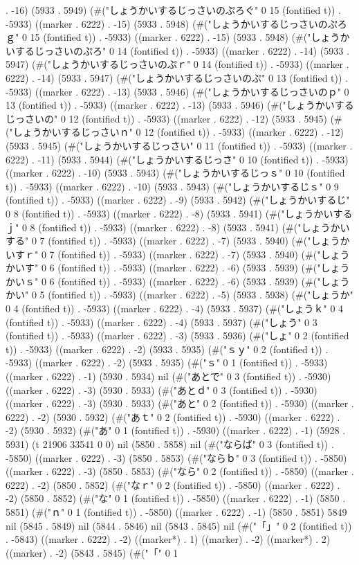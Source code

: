 . -16) (5933 . 5949) (#("しょうかいするじっさいのぷろぐ" 0 15 (fontified t)) . -5933) ((marker . 6222) . -15) (5933 . 5948) (#("しょうかいするじっさいのぷろｇ" 0 15 (fontified t)) . -5933) ((marker . 6222) . -15) (5933 . 5948) (#("しょうかいするじっさいのぷろ" 0 14 (fontified t)) . -5933) ((marker . 6222) . -14) (5933 . 5947) (#("しょうかいするじっさいのぷｒ" 0 14 (fontified t)) . -5933) ((marker . 6222) . -14) (5933 . 5947) (#("しょうかいするじっさいのぷ" 0 13 (fontified t)) . -5933) ((marker . 6222) . -13) (5933 . 5946) (#("しょうかいするじっさいのｐ" 0 13 (fontified t)) . -5933) ((marker . 6222) . -13) (5933 . 5946) (#("しょうかいするじっさいの" 0 12 (fontified t)) . -5933) ((marker . 6222) . -12) (5933 . 5945) (#("しょうかいするじっさいｎ" 0 12 (fontified t)) . -5933) ((marker . 6222) . -12) (5933 . 5945) (#("しょうかいするじっさい" 0 11 (fontified t)) . -5933) ((marker . 6222) . -11) (5933 . 5944) (#("しょうかいするじっさ" 0 10 (fontified t)) . -5933) ((marker . 6222) . -10) (5933 . 5943) (#("しょうかいするじっｓ" 0 10 (fontified t)) . -5933) ((marker . 6222) . -10) (5933 . 5943) (#("しょうかいするじｓ" 0 9 (fontified t)) . -5933) ((marker . 6222) . -9) (5933 . 5942) (#("しょうかいするじ" 0 8 (fontified t)) . -5933) ((marker . 6222) . -8) (5933 . 5941) (#("しょうかいするｊ" 0 8 (fontified t)) . -5933) ((marker . 6222) . -8) (5933 . 5941) (#("しょうかいする" 0 7 (fontified t)) . -5933) ((marker . 6222) . -7) (5933 . 5940) (#("しょうかいすｒ" 0 7 (fontified t)) . -5933) ((marker . 6222) . -7) (5933 . 5940) (#("しょうかいす" 0 6 (fontified t)) . -5933) ((marker . 6222) . -6) (5933 . 5939) (#("しょうかいｓ" 0 6 (fontified t)) . -5933) ((marker . 6222) . -6) (5933 . 5939) (#("しょうかい" 0 5 (fontified t)) . -5933) ((marker . 6222) . -5) (5933 . 5938) (#("しょうか" 0 4 (fontified t)) . -5933) ((marker . 6222) . -4) (5933 . 5937) (#("しょうｋ" 0 4 (fontified t)) . -5933) ((marker . 6222) . -4) (5933 . 5937) (#("しょう" 0 3 (fontified t)) . -5933) ((marker . 6222) . -3) (5933 . 5936) (#("しょ" 0 2 (fontified t)) . -5933) ((marker . 6222) . -2) (5933 . 5935) (#("ｓｙ" 0 2 (fontified t)) . -5933) ((marker . 6222) . -2) (5933 . 5935) (#("ｓ" 0 1 (fontified t)) . -5933) ((marker . 6222) . -1) (5930 . 5934) nil (#("あとで" 0 3 (fontified t)) . -5930) ((marker . 6222) . -3) (5930 . 5933) (#("あとｄ" 0 3 (fontified t)) . -5930) ((marker . 6222) . -3) (5930 . 5933) (#("あと" 0 2 (fontified t)) . -5930) ((marker . 6222) . -2) (5930 . 5932) (#("あｔ" 0 2 (fontified t)) . -5930) ((marker . 6222) . -2) (5930 . 5932) (#("あ" 0 1 (fontified t)) . -5930) ((marker . 6222) . -1) (5928 . 5931) (t 21906 33541 0 0) nil (5850 . 5858) nil (#("ならば" 0 3 (fontified t)) . -5850) ((marker . 6222) . -3) (5850 . 5853) (#("ならｂ" 0 3 (fontified t)) . -5850) ((marker . 6222) . -3) (5850 . 5853) (#("なら" 0 2 (fontified t)) . -5850) ((marker . 6222) . -2) (5850 . 5852) (#("なｒ" 0 2 (fontified t)) . -5850) ((marker . 6222) . -2) (5850 . 5852) (#("な" 0 1 (fontified t)) . -5850) ((marker . 6222) . -1) (5850 . 5851) (#("ｎ" 0 1 (fontified t)) . -5850) ((marker . 6222) . -1) (5850 . 5851) 5849 nil (5845 . 5849) nil (5844 . 5846) nil (5843 . 5845) nil (#("「」" 0 2 (fontified t)) . -5843) ((marker . 6222) . -2) ((marker*) . 1) ((marker) . -2) ((marker*) . 2) ((marker) . -2) (5843 . 5845) (#("「" 0 1 